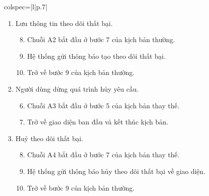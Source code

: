 \begin{longtblr}[caption = {Đặc tả usecase Theo dõi trận đấu, giải đấu},
  label = {tab:usecase5-spec},]{colspec={|l|p{.7\linewidth}|}}
\begin{minipage}{\linewidth}
\begin{enumerate}[label={\textbf{\textcolor{red}{A\arabic*}} --}, align=left, itemsep=-5pt]
\begin{enumerate}[leftmargin=-5px, align=left, label=\arabic*.]
              \item Nếu hủy theo dõi thành công, hệ thống gửi thông báo thành công về giao diện.
              \item[]
                    \hspace{-25px} Trở về bước 9 của kịch bản thường.
            \end{enumerate}

      \item Lưu thông tin theo dõi thất bại. \\
            \vspace{-1.5em}
            \begin{enumerate}[leftmargin=-5px, align=left, label=\arabic*.]
              \setcounter{enumii}{7}
              \item[]
                    \hspace{-25px} 	Chuỗi A2 bắt đầu ở bước 7 của kịch bản thường.
              \item Hệ thống gửi thông báo tạo theo dõi thất bại.
              \item[]
                    \hspace{-25px} Trở về bước 9 của kịch bản thường.
            \end{enumerate}

      \item Người dùng dừng quá trình hủy yêu cầu. \\
            \vspace{-1.5em}
            \begin{enumerate}[leftmargin=-5px, align=left, label=\arabic*.]
              \setcounter{enumii}{5}
              \item[]
                    \hspace{-25px} 	Chuỗi A3 bắt đầu ở bước 5 của kịch bản thay thế.
              \item Trở về giao diện ban đầu và kết thúc kịch bản.
            \end{enumerate}

      \item Huỷ theo dõi thất bại. \\
            \vspace{-1.5em}
            \begin{enumerate}[leftmargin=-5px, align=left, label=\arabic*.]
              \setcounter{enumii}{7}
              \item[]
                    \hspace{-25px} 	Chuỗi A4 bắt đầu ở bước 7 của kịch bản thay thế.
              \item Hệ thống gửi thông báo hủy theo dõi thất bại về giao diện.
              \item[]
                    \hspace{-25px} Trở về bước 9 của kịch bản thường.
            \end{enumerate}


\end{enumerate}
\end{minipage}
\end{longtblr}
